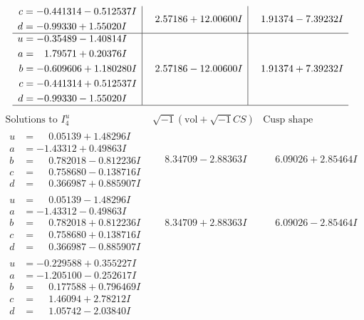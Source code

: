 \documentclass[1p]{elsarticle_modified}
\theoremstyle{definition}
\newcommand{\I}{\sqrt{-1}}
\begin{document}
$$\begin{array}{c|c|c}
\begin{aligned}
c &= -0.441314 - 0.512537 I \\
d &= -0.99330 + 1.55020 I\end{aligned}
 & \phantom{-}2.57186 + 12.00600 I & \phantom{-}1.91374 - 7.39232 I \\ \hline\begin{aligned}
u &= -0.35489 - 1.40814 I \\
a &= \phantom{-}1.79571 + 0.20376 I \\
b &= -0.609606 + 1.180280 I \\
c &= -0.441314 + 0.512537 I \\
d &= -0.99330 - 1.55020 I\end{aligned}
 & \phantom{-}2.57186 - 12.00600 I & \phantom{-}1.91374 + 7.39232 I\\
 \hline 
 \end{array}$$\newpage$$\begin{array}{c|c|c}  
\text{Solutions to }I^u_{4}& \I (\text{vol} + \sqrt{-1}CS) & \text{Cusp shape}\\
 \hline 
\begin{aligned}
u &= \phantom{-}0.05139 + 1.48296 I \\
a &= -1.43312 + 0.49863 I \\
b &= \phantom{-}0.782018 - 0.812236 I \\
c &= \phantom{-}0.758680 - 0.138716 I \\
d &= \phantom{-}0.366987 + 0.885907 I\end{aligned}
 & \phantom{-}8.34709 - 2.88363 I & \phantom{-}6.09026 + 2.85464 I \\ \hline\begin{aligned}
u &= \phantom{-}0.05139 - 1.48296 I \\
a &= -1.43312 - 0.49863 I \\
b &= \phantom{-}0.782018 + 0.812236 I \\
c &= \phantom{-}0.758680 + 0.138716 I \\
d &= \phantom{-}0.366987 - 0.885907 I\end{aligned}
 & \phantom{-}8.34709 + 2.88363 I & \phantom{-}6.09026 - 2.85464 I \\ \hline\begin{aligned}
u &= -0.229588 + 0.355227 I \\
a &= -1.205100 - 0.252617 I \\
b &= \phantom{-}0.177588 + 0.796469 I \\
c &= \phantom{-}1.46094 + 2.78212 I \\
d &= \phantom{-}1.05742 - 2.03840 I\end{aligned}

\end{array}$$
\end{document}
